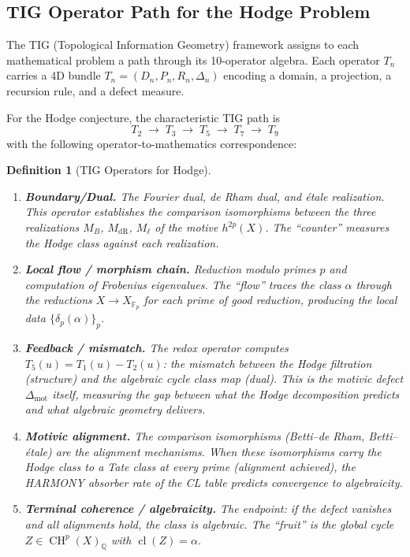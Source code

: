 \documentclass[11pt]{article}
\newtheorem{definition}[theorem]{Definition}
\theoremstyle{definition}
\DeclareMathOperator{\cl}{cl}
\DeclareMathOperator{\CH}{CH}
\begin{document}
\subsection{TIG Operator Path for the Hodge Problem}

The TIG (Topological Information Geometry) framework assigns to each
mathematical problem a path through its 10-operator algebra.  Each operator
$T_n$ carries a 4D bundle $T_n = (D_n, P_n, R_n, \Delta_n)$ encoding
a domain, a projection, a recursion rule, and a defect measure.

For the Hodge conjecture, the characteristic TIG path is
\[
  T_2 \;\to\; T_3 \;\to\; T_5 \;\to\; T_7 \;\to\; T_9
\]
with the following operator-to-mathematics correspondence:

\begin{definition}[TIG Operators for Hodge]
\label{def:tig-hodge}
\begin{enumerate}[leftmargin=2.5cm, labelsep=0.5cm]
  \item[$T_2$ (Counter):] \textbf{Boundary/Dual.}
    The Fourier dual, de Rham dual, and \'etale realization.  This operator
    establishes the comparison isomorphisms between the three realizations
    $M_B$, $M_{\mathrm{dR}}$, $M_\ell$ of the motive $h^{2p}(X)$.
    The ``counter'' measures the Hodge class against each realization.

  \item[$T_3$ (Progress):] \textbf{Local flow / morphism chain.}
    Reduction modulo primes $p$ and computation of Frobenius eigenvalues.
    The ``flow'' traces the class $\alpha$ through the reductions
    $X \to X_{\mathbb{F}_p}$ for each prime of good reduction, producing
    the local data $\{\delta_p(\alpha)\}_{p}$.

  \item[$T_5$ (Redox):] \textbf{Feedback / mismatch.}
    The redox operator computes $T_5(u) = T_1(u) - T_2(u)$: the mismatch
    between the Hodge filtration (structure) and the algebraic cycle class
    map (dual).  This is the motivic defect $\Delta_{\mathrm{mot}}$ itself,
    measuring the gap between what the Hodge decomposition predicts and what
    algebraic geometry delivers.

  \item[$T_7$ (Harmony):] \textbf{Motivic alignment.}
    The comparison isomorphisms (Betti--de Rham, Betti--\'etale) are the
    alignment mechanisms.  When these isomorphisms carry the Hodge class
    to a Tate class at every prime (alignment achieved), the HARMONY
    absorber rate of the CL table predicts convergence to algebraicity.

  \item[$T_9$ (Fruit):] \textbf{Terminal coherence / algebraicity.}
    The endpoint: if the defect vanishes and all alignments hold, the class
    is algebraic.  The ``fruit'' is the global cycle $Z \in \CH^p(X)_{\mathbb{Q}}$
    with $\cl(Z) = \alpha$.
\end{enumerate}
\end{definition}
\end{document}
